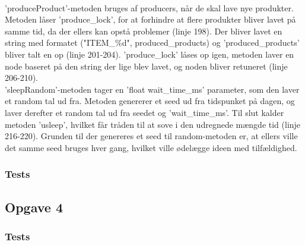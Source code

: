 \\ 'produceProduct'-metoden bruges af producers, når de skal lave nye produkter. Metoden låser 'produce_lock', for at forhindre at flere produkter bliver lavet på samme tid, da der ellers kan opstå problemer (linje 198). Der bliver lavet en string med formatet ("ITEM_\%d", produced_products) og 'produced_products' bliver talt en op (linje 201-204). 'produce_lock' låses op igen, metoden laver en node baseret på den string der lige blev lavet, og noden bliver retuneret (linje 206-210).
\\ 'sleepRandom'-metoden tager en 'float wait_time_ms' parameter, som den laver et random tal ud fra. Metoden genererer et seed ud fra tidspunket på dagen, og laver derefter et random tal ud fra seedet og 'wait_time_ms'. Til slut kalder metoden 'usleep', hvilket får tråden til at sove i den udregnede mængde tid (linje 216-220). Grunden til der genereres et seed til random-metoden er, at ellers ville det samme seed bruges hver gang, hvilket ville ødelægge ideen med tilfældighed.

\subsubsection{Tests}
\label{O3_Tests}

\subsection{Opgave 4}
\label{O4}


\subsubsection{Tests}
\label{O4_Tests}
